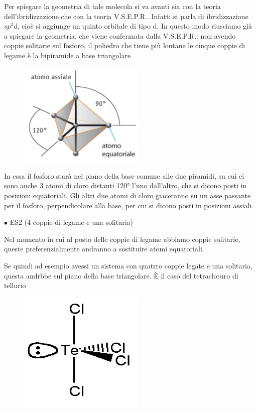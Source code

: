 Per spiegare la geometria di tale molecola si va avanti sia con la teoria dell'ibridizzazione che con la teoria V.S.E.P.R.. Infatti si parla di ibridizzazione $sp^3d$, cioè si aggiunge un quinto orbitale di tipo d. In questo modo riusciamo già a spiegare la geometria, che viene confermata dalla V.S.E.P.R.: non avendo coppie solitarie sul fosforo, il poliedro che tiene più lontane le cinque coppie di legame è la bipiramide a base triangolare
\begin{figure}[htp]
    \centering
    \includegraphics[width=6cm]{immagini/PCl_5.png}
\end{figure}
In essa il fosforo starà nel piano della base comune alle due piramidi, su cui ci sono anche 3 atomi di cloro distanti 120° l'uno dall'altro, che si dicono posti in posizioni equatoriali. Gli altri due atomi di cloro giaceranno su un asse passante per il fosforo, perpendicolare alla base, per cui si dicono posti in posizioni assiali.

$\bullet$ ES2  (4 coppie di legame e una solitaria)

Nel momento in cui al posto delle coppie di legame abbiamo coppie solitarie, queste preferenzialmente andranno a sostituire atomi equatoriali.

Se quindi ad esempio avessi un sistema con quatrro coppie legate e una solitaria, questa andrbbe sul piano della base triangolare. È il caso del tetracloruro di tellurio

\begin{figure}[htp]
    \centering
    \includegraphics[width=6cm]{immagini/TeCl_4.png}
\end{figure}